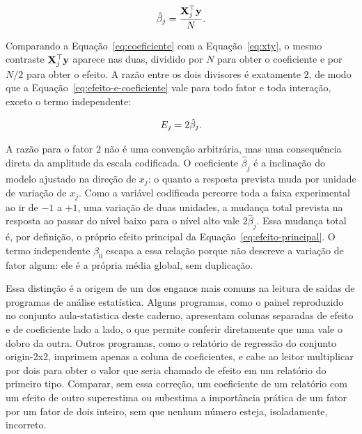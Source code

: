 \documentclass{doeapostila}
\begin{document}
\begin{equation}
  \hat{\beta}_{j} = \frac{\mathbf{X}_{j}^{\top}\mathbf{y}}{N} .
  \label{eq:coeficiente}
\end{equation}

Comparando a Equação~\eqref{eq:coeficiente} com a
Equação~\eqref{eq:xty}, o mesmo contraste $\mathbf{X}_{j}^{\top}\mathbf{y}$ aparece nas
duas, dividido por $N$ para obter o coeficiente e por $N/2$ para obter o
efeito. A razão entre os dois divisores é exatamente $2$, de modo que a
Equação~\eqref{eq:efeito-e-coeficiente} vale para todo fator e toda
interação, exceto o termo independente:

\begin{equation}
  E_{j} = 2\hat{\beta}_{j} .
  \label{eq:efeito-e-coeficiente}
\end{equation}

A razão para o fator $2$ não é uma convenção arbitrária, mas uma consequência
direta da amplitude da escala codificada. O coeficiente $\hat{\beta}_{j}$ é a
inclinação do modelo ajustado na direção de $x_{j}$: o quanto a resposta
prevista muda por unidade de variação de $x_{j}$. Como a variável codificada
percorre toda a faixa experimental ao ir de $-1$ a $+1$, uma variação de
duas unidades, a mudança total prevista na resposta ao passar do nível baixo
para o nível alto vale $2\hat{\beta}_{j}$. Essa mudança total é, por
definição, o próprio efeito principal da Equação~\eqref{eq:efeito-principal}.
O termo independente $\beta_{0}$ escapa a essa relação porque não descreve a
variação de fator algum: ele é a própria média global, sem duplicação.

Essa distinção é a origem de um dos enganos mais comuns na leitura de saídas
de programas de análise estatística. Alguns programas, como o painel
reproduzido no conjunto aula-statistica deste caderno, apresentam colunas
separadas de efeito e de coeficiente lado a lado, o que permite conferir
diretamente que uma vale o dobro da outra. Outros programas, como o relatório
de regressão do conjunto origin-2x2, imprimem apenas a coluna de
coeficientes, e cabe ao leitor multiplicar por dois para obter o valor que
seria chamado de efeito em um relatório do primeiro tipo. Comparar, sem essa
correção, um coeficiente de um relatório com um efeito de outro superestima
ou subestima a importância prática de um fator por um fator de dois inteiro,
sem que nenhum número esteja, isoladamente, incorreto.
\end{document}

